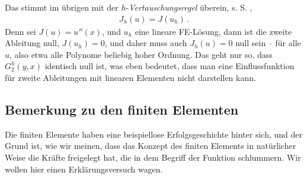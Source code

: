 {{{{{{Das stimmt im \"{u}brigen mit der $h$-{\em Vertauschungsregel\/} \"{u}berein, s. S. \pageref{Eq56},
\begin{align}
J_h(u) = J(u_h)\,.
\end{align}
Denn sei $J(u) = u''(x)$, und $u_h$ eine lineare FE-L\"{o}sung, dann ist die zweite Ableitung null, $J(u_h) = 0$, und daher muss auch $J_h(u) = 0$ null sein -- f\"{u}r alle $u$, also etwa alle Polynome beliebig hoher Ordnung. Das geht nur so, dass $G_2^h(y,x)$ identisch null ist, was eben bedeutet, dass man eine Einflussfunktion f\"{u}r zweite Ableitungen mit linearen Elementen nicht darstellen kann.





{\textcolor{sectionTitleBlue}{\section{Bemerkung zu den finiten Elementen}}}
Die finiten Elemente haben eine beispiellose Erfolgsgeschichte hinter sich, und der Grund ist, wie wir meinen, dass das Konzept des finiten Elements in nat\"{u}rlicher Weise die Kr\"{a}fte freigelegt hat, die in dem Begriff der Funktion schlummern. Wir wollen hier einen Erkl\"{a}rungsversuch wagen.

}}}}}}
